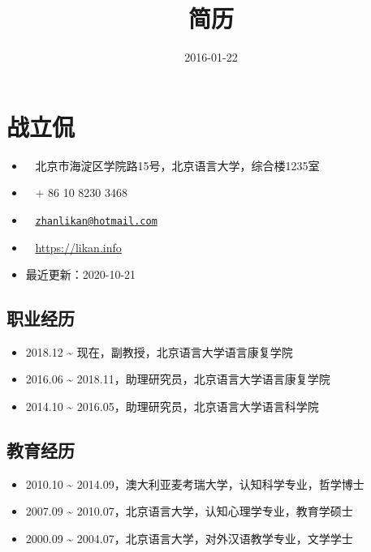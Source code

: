 \documentclass[
  12pt,
]{article}
\title{简历}
\author{}
\date{2016-01-22}
\providecommand{\tightlist}{%
  \setlength{\itemsep}{0pt}\setlength{\parskip}{0pt}}
\begin{document}
\maketitle

\hypertarget{ux6218ux7acbux4f83}{%
\section{战立侃}\label{ux6218ux7acbux4f83}}

\begin{itemize}
\tightlist
\item
  \footnotesize \faUniversity  ~
  北京市海淀区学院路15号，北京语言大学，综合楼1235室
\item
  \footnotesize \faPhone*  ~ + 86 10 8230 3468
\item
  \footnotesize \faEnvelope[regular] ~
  \href{mailto:zhanlikan@hotmail.com}{\nolinkurl{zhanlikan@hotmail.com}}
\item
  \footnotesize \faGlobe  ~ \url{https://likan.info}
\item
  最近更新：2020-10-21
\end{itemize}

\hypertarget{ux804cux4e1aux7ecfux5386}{%
\subsection{职业经历}\label{ux804cux4e1aux7ecfux5386}}

\begin{itemize}
\item
  2018.12 \textasciitilde{} 现在，副教授，北京语言大学语言康复学院
\item
  2016.06 \textasciitilde{}
  2018.11，助理研究员，北京语言大学语言康复学院
\item
  2014.10 \textasciitilde{} 2016.05，助理研究员，北京语言大学语言科学院
\end{itemize}

\hypertarget{ux6559ux80b2ux7ecfux5386}{%
\subsection{教育经历}\label{ux6559ux80b2ux7ecfux5386}}

\begin{itemize}
\item
  2010.10 \textasciitilde{}
  2014.09，澳大利亚麦考瑞大学，认知科学专业，哲学博士
\item
  2007.09 \textasciitilde{}
  2010.07，北京语言大学，认知心理学专业，教育学硕士
\item
  2000.09 \textasciitilde{}
  2004.07，北京语言大学，对外汉语教学专业，文学学士
\end{itemize}
\end{document}
